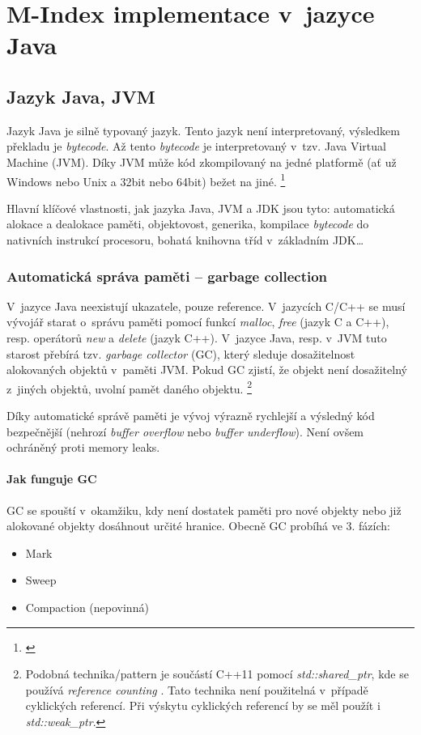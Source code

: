 \chapter{M-Index implementace v~jazyce Java}


\section{Jazyk Java, JVM}

Jazyk Java je silně typovaný jazyk. Tento jazyk není interpretovaný,
výsledkem překladu je \emph{bytecode}. Až tento \emph{bytecode} je interpretovaný
v~tzv. Java Virtual Machine (JVM).
Díky JVM může kód zkompilovaný na jedné platformě (ať už Windows nebo Unix a 32bit nebo 64bit) bežet na jiné. \footnote{\emph{}\cite{lindholm2013java}}

Hlavní klíčové vlastnosti, jak jazyka Java, JVM a JDK
jsou tyto: automatická alokace a dealokace paměti, objektovost, generika,
kompilace \emph{bytecode} do nativních instrukcí procesoru, bohatá
knihovna tříd v~základním JDK\ldots{}


\subsection{Automatická správa paměti -- garbage collection}

V~jazyce Java neexistují ukazatele, pouze reference. V~jazycích C/C++
se musí vývojář starat o~správu paměti pomocí funkcí \emph{malloc},
\emph{free} (jazyk C a C++), resp. operátorů \emph{new} a \emph{delete}
(jazyk C++). V~jazyce Java, resp. v~JVM \cite{lindholm2013java} tuto starost přebírá tzv. \emph{garbage
collector} (GC), který sleduje
dosažitelnost alokovaných objektů v~paměti JVM. Pokud GC
zjistí, že objekt není dosažitelný z~jiných objektů, uvolní pamět daného objektu.
\footnote{Podobná technika/pattern je součástí C++11 pomocí \emph{std::shared\_ptr},
kde se používá \emph{reference counting} \cite{ISO:2012:CPP}. Tato technika není použitelná v~případě cyklických referencí. Při výskytu cyklických referencí by se měl použít i \emph{std::weak\_ptr}.
}

Díky automatické správě paměti je vývoj výrazně rychlejší a výsledný
kód bezpečnější (nehrozí \emph{buffer overflow} nebo \emph{buffer underflow}). Není ovšem ochráněný proti
memory leaks.

\subsubsection{Jak funguje GC}
GC se spouští v~okamžiku, kdy není dostatek paměti pro nové objekty nebo již alokované objekty dosáhnout určité hranice. Obecně GC probíhá ve 3. fázích:
\begin{itemize}
  \item Mark
  \item Sweep
  \item Compaction (nepovinná)
\end{itemize}

